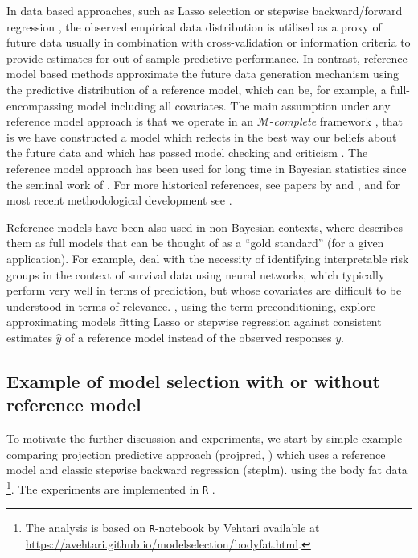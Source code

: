 \documentclass[american,]{article}
\let\rmarkdownfootnote\footnote%
\def\footnote{\protect\rmarkdownfootnote}
\theoremstyle{definition}
\begin{document}
In data based approaches, such as Lasso selection
\citep{tibshirani1996regression} or stepwise backward/forward
regression \citep{venables2013modern,harrell2015regression}, the
observed empirical data distribution is utilised as a proxy of future
data usually in combination with cross-validation or information
criteria to provide estimates for out-of-sample predictive
performance.  In contrast, reference model based methods approximate
the future data generation mechanism using the predictive distribution
of a reference model, which can be, for example, a full-encompassing
model including all covariates.  The main assumption under any
reference model approach is that we operate in an
$\mathcal{M}$-\textit{complete} framework
\citep{book:bernardo_smith,vehtari2012survey}, that is we have
constructed a model which reflects in the best way our beliefs about
the future data and which has passed model checking and criticism
\citep[see, e.g.][]{gelman2013bayesian}.  The reference model approach
has been used for long time in Bayesian statistics since the seminal
work of \citet{paper:reference_lindley}. For more historical
references, see papers by \citet{vehtari2012survey} and
\citet{paper:model_selection}, and for most recent methodological
development see \citet{paper:projpred}.

Reference models have been also used in non-Bayesian contexts, where
\cite{harrell2015regression} describes them as full models that can be
thought of as a ``gold standard'' (for a given application).  For
example, \cite{faraggi2001understanding} deal with the necessity of
identifying interpretable risk groups in the context of survival data
using neural networks, which typically perform very well in terms of
prediction, but whose covariates are difficult to be understood in
terms of relevance.  \cite{paul2008preconditioning}, using the term
preconditioning, explore approximating models fitting Lasso or
stepwise regression against consistent estimates $\hat{y}$ of a
reference model instead of the observed responses $y$.

\subsection{Example of model selection with or without reference model}

To motivate the further discussion and experiments, we start by simple
example comparing projection predictive approach (projpred,
\citet{paper:projpred}) which uses a reference model and classic
stepwise backward regression (steplm).  using the body fat data
\citep{johnson1996fitting}\footnote{The analysis is based on
  \texttt{R}-notebook by Vehtari available at
  \url{https://avehtari.github.io/modelselection/bodyfat.html}.}.  The
experiments are implemented in \texttt{R} \citep{Rcore2018}.
\end{document}
